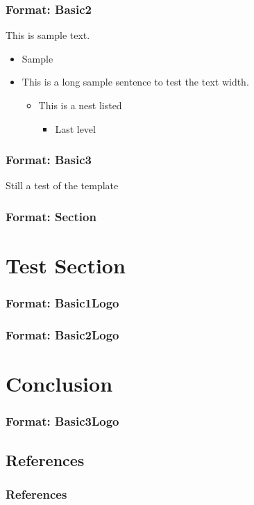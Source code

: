 \documentclass[compress]{beamer}
\begin{document}
\begin{frame}[Basic2] \frametitle{Format: Basic2}
    This is sample text.
    \begin{itemize}
        \item Sample
        \item This is a long sample sentence to test the text width.
        \begin{itemize}
            \item This is a nest listed
            \begin{itemize}
                \item Last level
            \end{itemize}
        \end{itemize}
    \end{itemize}
\end{frame}

\begin{frame}[Basic3] \frametitle{Format: Basic3}
    Still a test of the template
\end{frame}

\begin{frame}[Section] \frametitle{Format: Section}
\end{frame}


\section{Test Section}

\begin{frame} \frametitle{Format: Basic1Logo}
    {\color{VTmaroon}{This is a test of the template}}
\end{frame}

\begin{frame} \frametitle{Format: Basic2Logo}
    {\color{VTmaroon}{This is a test of the template}}
\end{frame}

\section[Conclusion]{Conclusion}

\begin{frame} \frametitle{Format: Basic3Logo}
    {\color{VTmaroon}{This is a test of the template}}
\end{frame}

\subsection{References}
\begin{frame}
    \frametitle{References}
    \nocite{*}
    \tiny
    
    
\end{frame}
\end{document}
